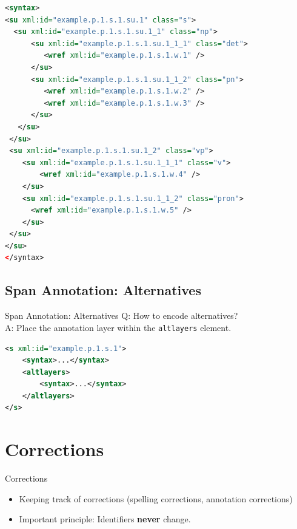 \documentclass[compress]{beamer}
\begin{document}
\begin{frame}[fragile]


\begin{lstlisting}[language=xml]
<syntax>
<su xml:id="example.p.1.s.1.su.1" class="s">     
  <su xml:id="example.p.1.s.1.su.1_1" class="np">
      <su xml:id="example.p.1.s.1.su.1_1_1" class="det">
         <wref xml:id="example.p.1.s.1.w.1" />       
      </su>
      <su xml:id="example.p.1.s.1.su.1_1_2" class="pn">
         <wref xml:id="example.p.1.s.1.w.2" />
         <wref xml:id="example.p.1.s.1.w.3" />        
      </su>         
   </su>
 </su>
 <su xml:id="example.p.1.s.1.su.1_2" class="vp"> 
    <su xml:id="example.p.1.s.1.su.1_1_1" class="v">
        <wref xml:id="example.p.1.s.1.w.4" />       
    </su>
    <su xml:id="example.p.1.s.1.su.1_1_2" class="pron">
      <wref xml:id="example.p.1.s.1.w.5" />       
    </su>
 </su>    
</su>
</syntax>
\end{lstlisting}                    

\end{frame}

\subsection{Span Annotation: Alternatives}

        
\begin{frame}[fragile]
    \begin{block}{Span Annotation: Alternatives}
        Q: How to encode alternatives? \\
        
        A: Place the annotation layer within the \texttt{altlayers} element.       
    \end{block}
    \begin{example}
        \begin{lstlisting}[language=xml]
<s xml:id="example.p.1.s.1">
    <syntax>...</syntax>
    <altlayers>
        <syntax>...</syntax>
    </altlayers>
</s>
        \end{lstlisting}
    \end{example}
\end{frame}


\section{Corrections}

        
\begin{frame}
    \begin{block}{Corrections}
        \begin{itemize}
            \item Keeping track of corrections (spelling corrections, annotation corrections)
            \item Important principle: Identifiers \textbf{never} change.
        \end{itemize}        
    \end{block}
\end{frame}
\end{document}
